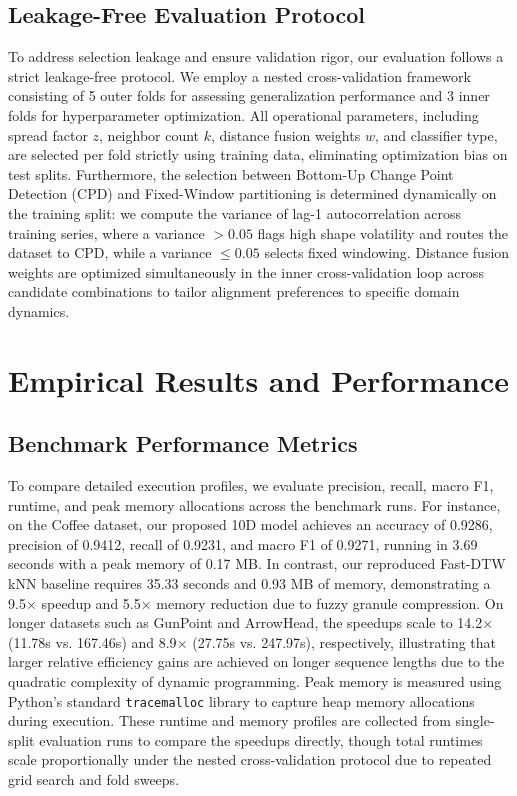 \documentclass[conference]{IEEEtran}
\begin{document}
\subsection{Leakage-Free Evaluation Protocol}
To address selection leakage and ensure validation rigor, our evaluation follows a strict leakage-free protocol. We employ a nested cross-validation framework consisting of 5 outer folds for assessing generalization performance and 3 inner folds for hyperparameter optimization. All operational parameters, including spread factor $z$, neighbor count $k$, distance fusion weights $w$, and classifier type, are selected per fold strictly using training data, eliminating optimization bias on test splits. Furthermore, the selection between Bottom-Up Change Point Detection (CPD) and Fixed-Window partitioning is determined dynamically on the training split: we compute the variance of lag-1 autocorrelation across training series, where a variance $> 0.05$ flags high shape volatility and routes the dataset to CPD, while a variance $\le 0.05$ selects fixed windowing. Distance fusion weights are optimized simultaneously in the inner cross-validation loop across candidate combinations to tailor alignment preferences to specific domain dynamics.

\section{Empirical Results and Performance}

\subsection{Benchmark Performance Metrics}
To compare detailed execution profiles, we evaluate precision, recall, macro F1, runtime, and peak memory allocations across the benchmark runs. For instance, on the Coffee dataset, our proposed 10D model achieves an accuracy of 0.9286, precision of 0.9412, recall of 0.9231, and macro F1 of 0.9271, running in 3.69 seconds with a peak memory of 0.17 MB. In contrast, our reproduced Fast-DTW kNN baseline requires 35.33 seconds and 0.93 MB of memory, demonstrating a 9.5$\times$ speedup and 5.5$\times$ memory reduction due to fuzzy granule compression. On longer datasets such as GunPoint and ArrowHead, the speedups scale to 14.2$\times$ (11.78s vs. 167.46s) and 8.9$\times$ (27.75s vs. 247.97s), respectively, illustrating that larger relative efficiency gains are achieved on longer sequence lengths due to the quadratic complexity of dynamic programming. Peak memory is measured using Python's standard \texttt{tracemalloc} library to capture heap memory allocations during execution. These runtime and memory profiles are collected from single-split evaluation runs to compare the speedups directly, though total runtimes scale proportionally under the nested cross-validation protocol due to repeated grid search and fold sweeps.
\end{document}
